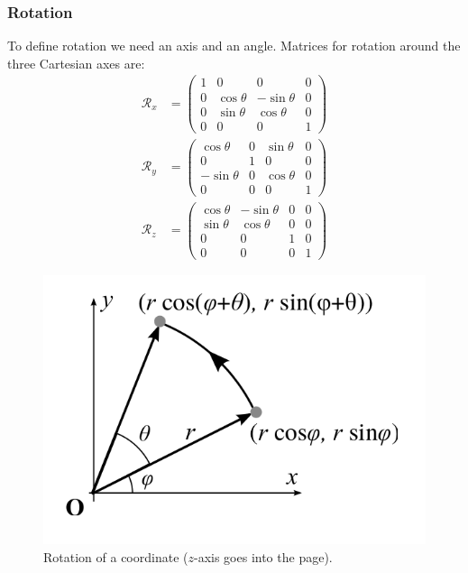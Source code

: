 \documentclass[11pt]{article}
\begin{document}
\subsubsection{Rotation}
To define rotation we need an axis and an angle.
Matrices for rotation around the three Cartesian axes are:
\begin{align*}
  \mathcal{R}_x &=
  \begin{pmatrix}
    1 & 0 & 0 & 0 \\
    0 & \cos \theta & -\sin \theta & 0 \\
    0 & \sin \theta & \cos \theta & 0 \\
    0 & 0 & 0 & 1
  \end{pmatrix} \\
  \mathcal{R}_y &=
  \begin{pmatrix}
    \cos \theta & 0 & \sin \theta & 0 \\
    0 & 1 & 0 & 0 \\
    -\sin \theta & 0 & \cos \theta & 0 \\
    0 & 0 & 0 & 1
  \end{pmatrix} \\
  \mathcal{R}_z &=
  \begin{pmatrix}
    \cos \theta &  -\sin \theta & 0 & 0 \\
    \sin \theta & \cos \theta & 0 & 0 \\
    0 & 0 & 1 & 0 \\
    0 & 0 & 0 & 1
  \end{pmatrix}
\end{align*}

\begin{figure}[htb!]
  \caption{Rotation of a coordinate ($z$-axis goes into the page).}
  \includegraphics[scale=0.3]{deriverotate}
  \centering
\end{figure}
\end{document}
